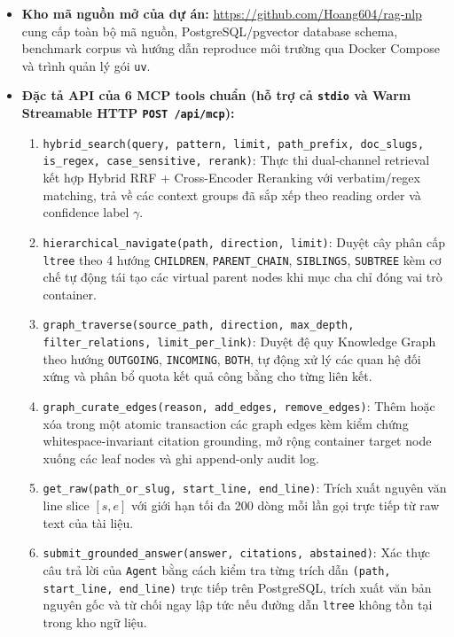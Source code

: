 \begin{itemize}
    \item \textbf{Kho mã nguồn mở của dự án:} \url{https://github.com/Hoang604/rag-nlp} cung cấp toàn bộ mã nguồn, PostgreSQL/pgvector database schema, benchmark corpus và hướng dẫn reproduce môi trường qua Docker Compose và trình quản lý gói \texttt{uv}.
    \item \textbf{Đặc tả API của 6 MCP tools chuẩn \cite{anthropic2024mcp} (hỗ trợ cả \texttt{stdio} và Warm Streamable HTTP \texttt{POST /api/mcp}):}
    \begingroup
    \raggedright
    \begin{enumerate}
        \item \texttt{hybrid\_search(query, \allowbreak pattern, \allowbreak limit, \allowbreak path\_prefix, \allowbreak doc\_slugs, \allowbreak is\_regex, \allowbreak case\_sensitive, \allowbreak rerank)}: Thực thi dual-channel retrieval kết hợp Hybrid RRF + Cross-Encoder Reranking với verbatim/regex matching, trả về các context groups đã sắp xếp theo reading order và confidence label $\gamma$.
        \item \texttt{hierarchical\_navigate(path, \allowbreak direction, \allowbreak limit)}: Duyệt cây phân cấp \texttt{ltree} theo 4 hướng \texttt{CHILDREN}, \texttt{PARENT\_CHAIN}, \texttt{SIBLINGS}, \texttt{SUBTREE} kèm cơ chế tự động tái tạo các virtual parent nodes khi mục cha chỉ đóng vai trò container.
        \item \texttt{graph\_traverse(source\_path, \allowbreak direction, \allowbreak max\_depth, \allowbreak filter\_relations, \allowbreak limit\_per\_link)}: Duyệt đệ quy Knowledge Graph theo hướng \texttt{OUTGOING}, \texttt{INCOMING}, \texttt{BOTH}, tự động xử lý các quan hệ đối xứng và phân bổ quota kết quả công bằng cho từng liên kết.
        \item \texttt{graph\_curate\_edges(reason, \allowbreak add\_edges, \allowbreak remove\_edges)}: Thêm hoặc xóa trong một atomic transaction các graph edges kèm kiểm chứng whitespace-invariant citation grounding, mở rộng container target node xuống các leaf nodes và ghi append-only audit log.
        \item \texttt{get\_raw(path\_or\_slug, \allowbreak start\_line, \allowbreak end\_line)}: Trích xuất nguyên văn line slice $[s, e]$ với giới hạn tối đa 200 dòng mỗi lần gọi trực tiếp từ raw text của tài liệu.
        \item \texttt{submit\_grounded\_answer(answer, \allowbreak citations, \allowbreak abstained)}: Xác thực câu trả lời của \texttt{Agent} bằng cách kiểm tra từng trích dẫn \texttt{(path, start\_line, end\_line)} trực tiếp trên PostgreSQL, trích xuất văn bản nguyên gốc và từ chối ngay lập tức nếu đường dẫn \texttt{ltree} không tồn tại trong kho ngữ liệu.

\end{enumerate}
\end{itemize}
